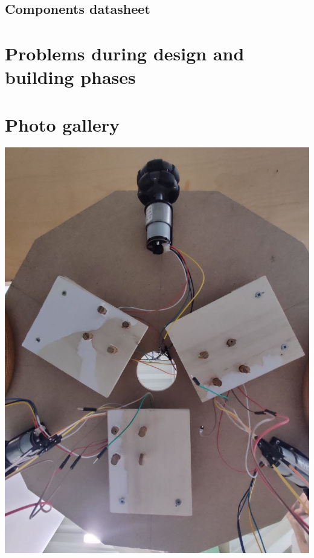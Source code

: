 \documentclass{article}
\begin{document}
\subsection{Components datasheet}

\newpage
\section{Problems during design and building phases} %

\newpage
\section{Photo gallery}
\noindent
\begin{minipage}[t]{0.5\textwidth}
  \vspace{0pt}
  \includegraphics[width=0.9\linewidth]{photos/1.jpg}
  \vspace{0pt}

\end{minipage}
\end{document}
